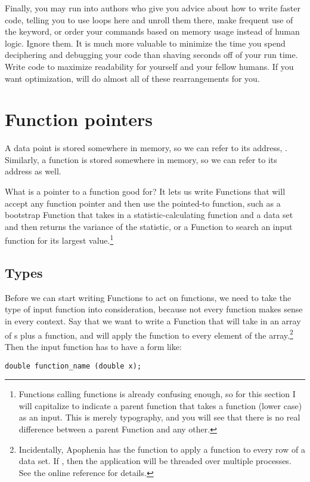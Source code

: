 Finally, you may run into authors who give you advice about how to write
faster code, telling you to use loops here and unroll them there, make
frequent use of the  keyword, or order your commands based
on memory usage instead of human logic. Ignore them. It is much more
valuable to minimize the time you spend deciphering and debugging your
code than shaving seconds off of your run time.  Write code to maximize
readability for yourself and your fellow humans. If you want optimization,
 will do almost all of these rearrangements for you.


\section{Function pointers} 
A data point  is stored somewhere in memory, so we can refer to
its address, . Similarly, a function  is stored somewhere
in memory, so we can refer to its address as well.

What is a pointer to a function good for?  It lets us write
Functions that will accept any function pointer and then use the
pointed-to function, such as a bootstrap Function that takes in a
statistic-calculating function and a data set and then returns the
variance of the statistic, or a Function to search an input function
for its largest value.\footnote{Functions calling functions is already
confusing enough, so for this section I will capitalize 
to indicate a parent function that takes a function (lower case) as an
input. This is merely typography, and you will see that there is no real
difference between a parent Function and any other.}

\subsection{Types} Before we can start writing Functions to act on
functions, we need to take the type of input function into
consideration, because not every function makes sense in every context. Say
that we want to write a Function that will take in an array of
s plus a function, and will apply the function to every
element of the array.\footnote{Incidentally, Apophenia has the
 function to apply a function to every row of
a data set. If , then the
application will be threaded over multiple processes. See the online
reference for details.}
Then the input function has to have a form like:
\begin{lstlisting}
double function_name (double x);
\end{lstlisting}

